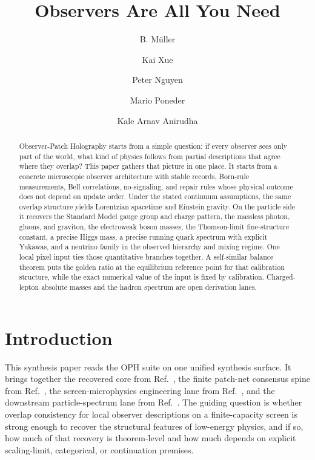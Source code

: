 \documentclass[11pt]{article}
\title{Observers Are All You Need}
\author{B. M\"uller \and Kai Xue \and Peter Nguyen \and Mario Poneder \and Kale Arnav Anirudha}
\date{\OPHPaperReleaseDate}
\begin{document}
\maketitle
\OPHPaperReleaseBanner

\begin{abstract}
Observer-Patch Holography starts from a simple question: if every observer sees only part of the world, what kind of physics follows from partial descriptions that agree where they overlap? This paper gathers that picture in one place. It starts from a concrete microscopic observer architecture with stable records, Born-rule measurements, Bell correlations, no-signaling, and repair rules whose physical outcome does not depend on update order. Under the stated continuum assumptions, the same overlap structure yields Lorentzian spacetime and Einstein gravity. On the particle side it recovers the Standard Model gauge group and charge pattern, the massless photon, gluons, and graviton, the electroweak boson masses, the Thomson-limit fine-structure constant, a precise Higgs mass, a precise running quark spectrum with explicit Yukawas, and a neutrino family in the observed hierarchy and mixing regime. One local pixel input ties those quantitative branches together. A self-similar balance theorem puts the golden ratio at the equilibrium reference point for that calibration structure, while the exact numerical value of the input is fixed by calibration. Charged-lepton absolute masses and the hadron spectrum are open derivation lanes.
\end{abstract}

\tableofcontents
\newpage

\section{Introduction}

This synthesis paper reads the OPH suite on one unified synthesis surface. It brings
together the recovered core from Ref.~\cite{ophcompact}, the finite patch-net consensus spine from
Ref.~\cite{ophconsensus}, the screen-microphysics engineering lane from Ref.~\cite{ophmicrophysics},
and the downstream particle-spectrum lane from Ref.~\cite{ophparticles}. The guiding
question is whether overlap consistency for local observer descriptions on a finite-capacity screen
is strong enough to recover the structural features of low-energy physics, and if so, how much of
that recovery is theorem-level and how much depends on explicit scaling-limit,
categorical, or continuation premises.
\end{document}
